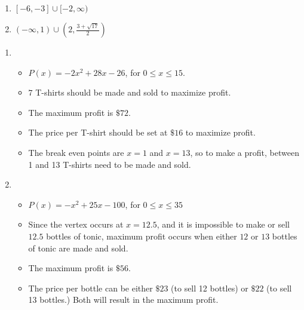 \begin{multicols}{2}
\begin{enumerate}
\setcounter{enumi}{\value{HW}}


\item  $[-6,-3] \cup [-2, \infty)$

\item  $(-\infty, 1) \cup \left(2, \frac{3+\sqrt{17}}{2}\right)$


\setcounter{HW}{\value{enumi}}
\end{enumerate}
\end{multicols}


\begin{enumerate}
\setcounter{enumi}{\value{HW}}

\item \begin{itemize}

\item $P(x) = -2x^2+28x-26$, for $0 \leq x \leq 15$.

\item $7$ T-shirts should be made and  sold to maximize profit. 

\item The maximum profit is $\$72$. 

\item The price per T-shirt should be set at $\$16$ to maximize profit. 

\item The break even points are $x=1$ and $x=13$, so to make a profit, between 1 and 13 T-shirts need to be made and sold.

\end{itemize}

\item  \begin{itemize}

\item   $P(x) = -x^2+25x-100$, for $0 \leq x \leq 35$

\item  Since the vertex occurs at $x=12.5$, and it is impossible to make or sell $12.5$ bottles of tonic, maximum profit occurs when either $12$ or $13$ bottles of tonic are made and sold.

\item  The maximum profit is $\$56$.

\item  The price per bottle can be either $\$23$ (to sell 12 bottles) or $\$22$ (to sell 13 bottles.)  Both will result in the maximum profit.


\end{itemize}
\end{enumerate}
